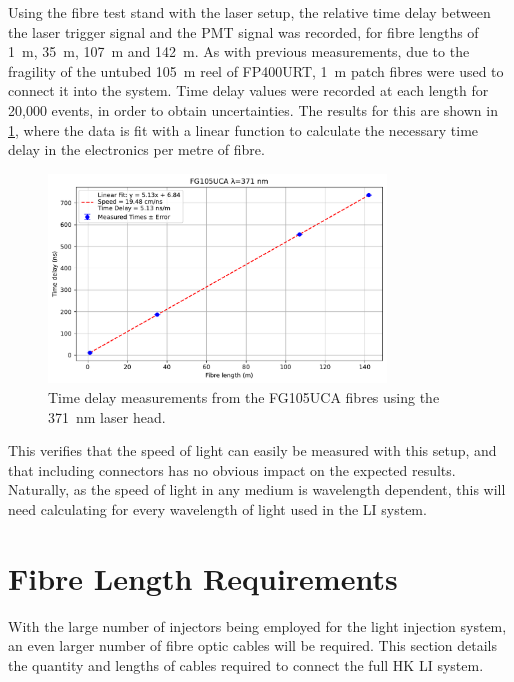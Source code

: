 \documentclass[a4paper,11pt]{article}
\begin{document}
Using the fibre test stand with the laser setup, the relative time delay between the laser trigger signal and the PMT signal was recorded, for fibre lengths of 1~m, 35~m, 107~m and 142~m. As with previous measurements, due to the fragility of the untubed 105~m reel of FP400URT, 1~m patch fibres were used to connect it into the system. Time delay values were recorded at each length for 20,000 events, in order to obtain uncertainties. The results for this are shown in \cref{fig:FP400URTc}, where the data is fit with a linear function to calculate the necessary time delay in the electronics per metre of fibre.
\begin{figure}[h]
\centering
\includegraphics[width=0.8\textwidth]{FG105UCATiming_371nm.pdf}
\caption{Time delay measurements from the FG105UCA fibres using the 371~nm laser head.}\label{fig:FP400URTc}
\end{figure}
This verifies that the speed of light can easily be measured with this setup, and that including connectors has no obvious impact on the expected results. Naturally, as the speed of light in any medium is wavelength dependent, this will need calculating for every wavelength of light used in the LI system.

\section{Fibre Length Requirements}\label{sec:lengths}

With the large number of injectors being employed for the light injection system, an even larger number of fibre optic cables will be required. This section details the quantity and lengths of cables required to connect the full HK LI system.
\end{document}
